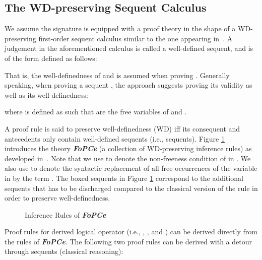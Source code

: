 \documentclass[copyright]{eptcs}
\begin{document}
\subsection{The WD-preserving Sequent Calculus}
We assume the signature  is equipped with a proof theory in the shape of a WD-preserving first-order sequent calculus similar to the one appearing in~\cite{icfemMehta08}. A judgement in the aforementioned calculus is called a well-defined sequent, and is of the form  defined as follows:

That is, the well-definedness of  and  is assumed when proving . Generally speaking, when proving a sequent , the approach suggests proving its validity as well as its well-definedness:

where  is defined as  such that  are the free variables of  and .
\par
A proof rule is said to preserve well-definedness (WD) iff its consequent and antecedents only contain well-defined sequents (i.e.,  sequents). Figure \ref{fopced} introduces the theory \textit{\textbf{FoPCe}} (a collection of WD-preserving inference rules) as developed in~\cite{icfemMehta08}. Note that we use  to denote the non-freeness condition of  in .  We also use  to denote the syntactic replacement of all free occurrences of the variable  in  by the term . The boxed sequents in Figure \ref{fopced} correspond to the additional sequents that has to be discharged compared to the classical version of the rule in order to preserve well-definedness.
\begin{figure}[h]
\fbox{
\begin{minipage}{15.5cm}
\begin{center}

\end{center}
\begin{center}

\end{center}
\begin{center}

\end{center}
\begin{center}

\end{center}
\begin{center}

\end{center}
\begin{center}

\end{center}
\end{minipage}
}
\caption{Inference Rules of \textbf{\textit{FoPCe}}}
\label{fopced}
\end{figure}
\newline Proof rules for derived logical operator (i.e., , ,  and ) can be derived directly from the rules of \textbf{\textit{FoPCe}}. The following two proof rules can be derived with a detour through  sequents (classical reasoning):
\end{document}
